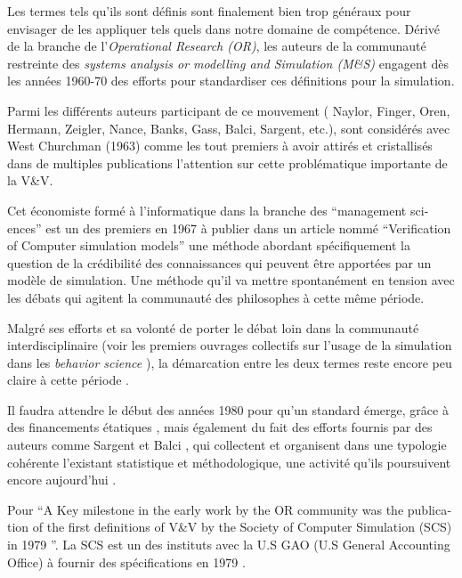 Les termes tels qu'ils sont définis sont finalement bien trop généraux pour envisager de les appliquer tels quels dans notre domaine de compétence. Dérivé de la branche de l'\textit{Operational Research (OR)}, les auteurs de la communauté restreinte des \textit{systems analysis or modelling and Simulation (M\&S) } engagent dès les années 1960-70 des efforts pour standardiser ces définitions pour la simulation.

Parmi les différents auteurs participant de ce mouvement ( Naylor, Finger, Oren, Hermann, Zeigler, Nance, Banks, Gass, Balci, Sargent, etc.), \textcite{Naylor1966} sont considérés avec West Churchman (1963) comme les tout premiers à avoir attirés et cristallisés  dans de multiples publications l'attention sur cette problématique importante de la V\&V.

Cet économiste formé à l'informatique dans la branche des \foreignquote{english}{management sciences} \autocite{Stricklin1985} est un des premiers en 1967 \autocite{Naylor1967} à publier dans un article nommé \foreignquote{english}{Verification of Computer simulation models} une méthode abordant spécifiquement la question de la crédibilité des connaissances qui peuvent être apportées par un modèle de simulation. Une méthode qu'il va mettre spontanément en tension avec les débats qui agitent la communauté des philosophes à cette même période.

Malgré ses efforts et sa volonté de porter le débat loin dans la communauté interdisciplinaire (voir les premiers ouvrages collectifs sur l'usage de la simulation dans les \textit{behavior science} \autocites{Dutton1971, Guetzkow1972} ), la démarcation entre les deux termes reste encore peu claire à cette période   \autocites[165]{Nance2002}[3]{Balci1986}. 

Il faudra attendre le début des années 1980 pour qu'un standard émerge, grâce à des financements étatiques \autocite{Balci1986}, mais également du fait des efforts fournis par des auteurs comme Sargent et Balci \autocite{Nance2002}, qui collectent et organisent dans une typologie cohérente l'existant statistique et méthodologique, une activité qu'ils poursuivent encore aujourd'hui \autocite{Balci1998}.

Pour \autocite[22]{Oberkampf2010} \foreignquote{english}{A Key milestone in the early work by the OR community was the publication of the first definitions of V\&V by the Society of Computer Simulation (SCS) in 1979 \autocite{Schlesinger1979}}. La SCS est un des instituts avec la U.S GAO (U.S General Accounting Office) à fournir des spécifications en 1979 \autocite{Balci1986}.

